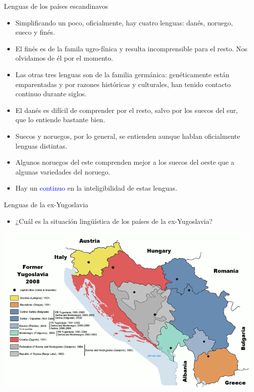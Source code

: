 \documentclass[handout]{beamer}
\begin{document}
\begin{frame}{Lenguas de los países escandinavos}
\begin{itemize}
	\item Simplificando un poco, oficialmente, hay cuatro lenguas: danés, noruego, sueco y finés.
	\item El finés es de la famila ugro-fínica y resulta incomprensible para el resto. Nos olvidamos de él por el momento.
	\item Las otras tres lenguas son de la familia germánica: genéticamente están emparentadas y por razones históricas y culturales, han tenido contacto continuo durante siglos.
	\item El danés es difícil de comprender por el resto, salvo por los suecos del sur, que lo entiende bastante bien. 
	\item Suecos y noruegos, por lo general, se entienden aunque hablan oficialmente lenguas distintas. 
	\item Algunos noruegos del este comprenden mejor a los suecos del oeste que a algunas variedades del noruego.
	\item Hay un \textcolor{blue}{continuo} en la inteligibilidad de estas lenguas.
\end{itemize}
\end{frame}

\begin{frame}{Lenguas de la ex-Yugoslavia}
\begin{itemize}
	\item ¿Cuál es la situación lingüística de los países de la ex-Yugoslavia? 
\end{itemize}
	\begin{center} 
	  \includegraphics[scale=0.35]{img/yugoslavia.png} 
	\end{center}
\end{frame}
\end{document}
